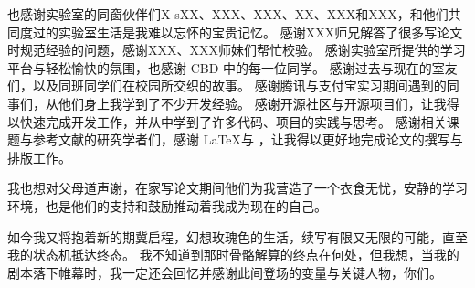 \begin{acknowledgements}
也感谢实验室的同窗伙伴们X sXX、XXX、XXX、XX、XXX和XXX，和他们共同度过的实验室生活是我难以忘怀的宝贵记忆。
感谢XXX师兄解答了很多写论文时规范经验的问题，感谢XXX、XXX师妹们帮忙校验。
感谢实验室所提供的学习平台与轻松愉快的氛围，也感谢 CBD 中的每一位同学。
感谢过去与现在的室友们，以及同班同学们在校园所交织的故事。
感谢腾讯与支付宝实习期间遇到的同事们，从他们身上我学到了不少开发经验。
感谢开源社区与开源项目们，让我得以快速完成开发工作，并从中学到了许多代码、项目的实践与思考。
感谢相关课题与参考文献的研究学者们，感谢 \LaTeX 与 \thuthesis，让我得以更好地完成论文的撰写与排版工作。

我也想对父母道声谢，在家写论文期间他们为我营造了一个衣食无忧，安静的学习环境，也是他们的支持和鼓励推动着我成为现在的自己。

如今我又将抱着新的期冀启程，幻想玫瑰色的生活，续写有限又无限的可能，直至我的状态机抵达终态。
我不知道到那时骨骼解算的终点在何处，但我想，当我的剧本落下帷幕时，我一定还会回忆并感谢此间登场的变量与关键人物，你们。
  
\end{acknowledgements}
  
